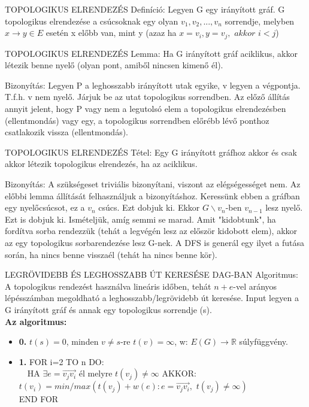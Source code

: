 \documentclass[]{article}
\begin{document}
\begin{shaded}
TOPOLOGIKUS ELRENDEZÉS Definíció: Legyen G egy irányított gráf. G topologikus elrendezése a csúcsoknak egy olyan $v_1, v_2,..., v_n$ sorrendje, melyben $x\rightarrow y \in E$ esetén x előbb van, mint y (azaz ha $x = v_i, y = v_j,\,\,akkor\,\,i<j$)
\end{shaded}
\begin{framed}
TOPOLOGIKUS ELRENDEZÉS Lemma: Ha G irányított gráf aciklikus, akkor létezik benne nyelő (olyan pont, amiből nincsen kimenő él).
\end{framed}
\begin{leftbar}
Bizonyítás: Legyen P a leghosszabb irányított utak egyike, v legyen a végpontja. T.f.h. v nem nyelő. Járjuk be az utat topologikus sorrendben. Az előző állítás annyit jelent, hogy P vagy nem a legutolsó elem a topologikus elrendezésben (ellentmondás) vagy egy, a topologikus sorrendben előrébb lévő ponthoz csatlakozik vissza (ellentmondás).
\end{leftbar}
\begin{framed}
TOPOLOGIKUS ELRENDEZÉS Tétel: Egy G irányított gráfhoz akkor és csak akkor létezik topologikus elrendezés, ha az aciklikus.
\end{framed}
\begin{leftbar}
Bizonyítás: A szükségeset triviális bizonyítani, viszont az elégségességet nem. Az előbbi lemma állítását felhasználjuk a bizonyításhoz. Keressünk ebben a gráfban egy nyelőcsúcsot, ez a $v_n$ csúcs. Ezt dobjuk ki. Ekkor $G\backslash{v_n}$-ben $v_{n-1}$ lesz nyelő. Ezt is dobjuk ki. Ismételjük, amíg semmi se marad. Amit "kidobtunk", ha fordítva sorba rendezzük (tehát a legvégén lesz az először kidobott elem), akkor az egy topologikus sorbarendezése lesz G-nek. A DFS is generál egy ilyet a futása során, ha nincs benne visszaél (tehát ha nincs benne kör).
\end{leftbar}
\begin{framed}
LEGRÖVIDEBB ÉS LEGHOSSZABB ÚT KERESÉSE DAG-BAN Algoritmus: A topologikus rendezést használva lineáris időben, tehát $n+e$-vel arányos lépésszámban megoldható a leghosszabb/legrövidebb út keresése.
Input legyen a G irányított gráf és annak egy topologikus sorrendje (s).
\\
\textbf{Az algoritmus:}
\begin{itemize}
\item{\textbf{0.}} $t(s) = 0$, minden $v \neq s$-re $t(v) = \infty$, w: $E(G)\rightarrow \mathbb{R}$ súlyfüggvény.
\item{\textbf{1.}} FOR i=2 TO n DO:\\
	$\quad$HA $\exists e = \overrightarrow{v_jv_i}$ él melyre $t(v_j) \neq \infty$ AKKOR: $t(v_i) = min/max(t(v_j)+w(e): e = \overrightarrow{v_jv_i},\,\, t(v_j) \neq \infty)$
\\END FOR
\end{itemize}
\end{framed}
\end{document}
